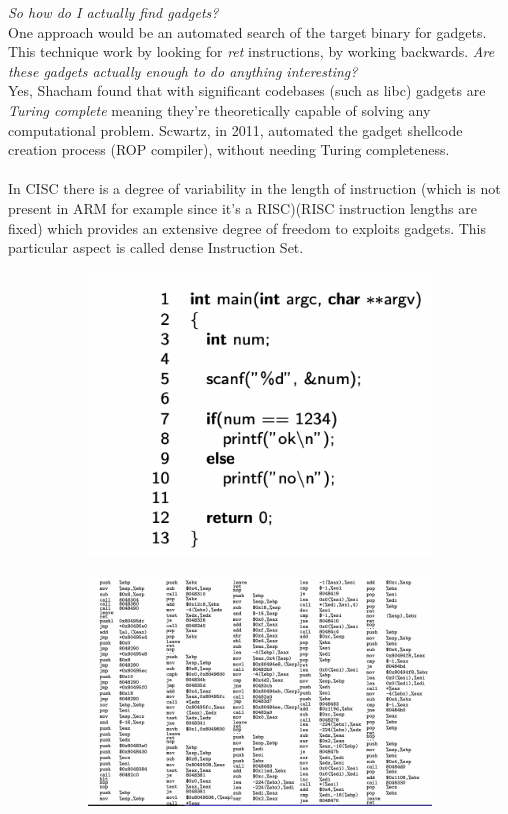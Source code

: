 \documentclass[11pt, oneside]{article}   	%
\begin{document}
\emph{So how do I actually find gadgets?}\\
One approach would be an automated search of the target binary for gadgets. This technique work by looking for \emph{ret} instructions, by working backwards.
\emph{Are these gadgets actually enough to do anything interesting?}\\
Yes, Shacham found that with significant codebases (such as libc) gadgets are \emph{Turing complete} meaning they're theoretically capable of solving any computational problem. Scwartz, in 2011, automated the gadget shellcode creation process (ROP compiler), without needing Turing completeness.\\\\
In CISC there is a degree of variability in the length of instruction (which is not present in ARM for example since it's a RISC)(RISC instruction lengths are fixed) which provides an extensive degree of freedom to exploits gadgets. This particular aspect is called dense Instruction Set.
\begin{figure}[H]
\begin{subfigure}[H]{0.4\linewidth}
\includegraphics[width=\linewidth]{b1}
\end{subfigure}
\begin{subfigure}[H]{0.8\linewidth}
\includegraphics[width=\linewidth]{b2}
\end{subfigure}%
\end{figure}
\end{document}
